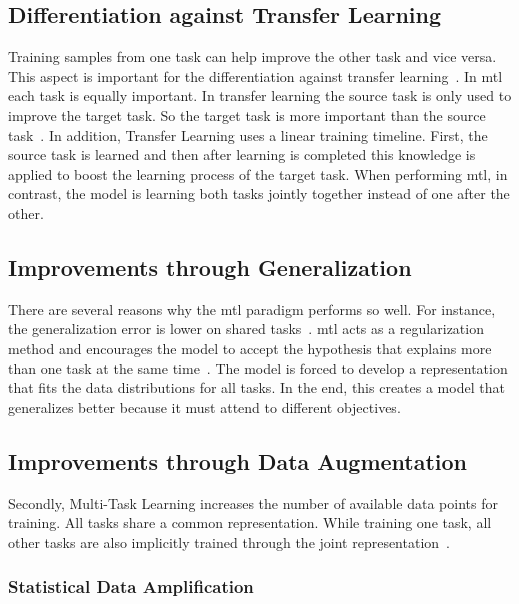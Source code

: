 \subsection{Differentiation against Transfer Learning}

Training samples from one task can help improve the other task and vice versa. This aspect is important for the differentiation against transfer learning~\cite{Pratt1993}. In \gls{mtl} each task is equally important. In transfer learning the source task is only used to improve the target task. So the target task is more important than the source task~\cite{Zhang2017a}. In addition, Transfer Learning uses a linear training timeline. First, the source task is learned and then after learning is completed this knowledge is applied to boost the learning process of the target task. When performing \gls{mtl}, in contrast, the model is learning both tasks jointly together instead of one after the other.


\subsection{Improvements through Generalization}
\label{sec:03_mtlAdvantages}

There are several reasons why the \gls{mtl} paradigm performs so well. For instance, the generalization error is lower on shared tasks~\cite{Caruana1993}. \gls{mtl} acts as a regularization method and encourages the model to accept the hypothesis that explains more than one task at the same time~\cite{Ruder2017}. The model is forced to develop a representation that fits the data distributions for all tasks. In the end, this creates a model that generalizes better because it must attend to different objectives.

\subsection{Improvements through Data Augmentation}

Secondly, Multi-Task Learning increases the number of available data points for training. All tasks share a common representation. While training one task, all other tasks are also implicitly trained through the joint representation~\cite{Caruana1993}.

\subsubsection*{Statistical Data Amplification}

